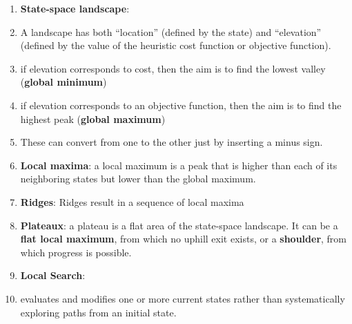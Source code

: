 \begin{enumerate}
    \item[] {\fontsize{18}{18} \textbf{State-space landscape}}:

    \item A landscape has both “location” (defined by the state) and “elevation” (defined by the value of the heuristic cost function or objective function).
    \hfill \cite{ai/book/Artificial-Intelligence-A-Modern-Approach/Russell-Norvig}

    \item if elevation corresponds to cost, then the aim is to find the lowest valley (\textbf{global minimum})
    \hfill \cite{ai/book/Artificial-Intelligence-A-Modern-Approach/Russell-Norvig}

    \item if elevation corresponds to an objective function, then the aim is to find the highest peak (\textbf{global maximum})
    \hfill \cite{ai/book/Artificial-Intelligence-A-Modern-Approach/Russell-Norvig}

    \item These can convert from one to the other just by inserting a minus sign.
    \hfill \cite{ai/book/Artificial-Intelligence-A-Modern-Approach/Russell-Norvig}


    \item \textbf{Local maxima}: a local maximum is a peak that is higher than each of its neighboring states but lower than the global maximum.
    \hfill \cite{ai/book/Artificial-Intelligence-A-Modern-Approach/Russell-Norvig}

    \item \textbf{Ridges}:  Ridges result in a sequence of local maxima
    \hfill \cite{ai/book/Artificial-Intelligence-A-Modern-Approach/Russell-Norvig}

    \item \textbf{Plateaux}: a plateau is a flat area of the state-space landscape. It can be a \textbf{flat local maximum}, from which no uphill exit exists, or a \textbf{shoulder}, from which progress is possible.
    \hfill \cite{ai/book/Artificial-Intelligence-A-Modern-Approach/Russell-Norvig}







    \vspace{1cm}
    \item[] {\fontsize{18}{18} \textbf{Local Search}}:

    \item evaluates and modifies one or more current states rather than systematically exploring paths from an initial state.
    \hfill \cite{ai/book/Artificial-Intelligence-A-Modern-Approach/Russell-Norvig}


\end{enumerate}
